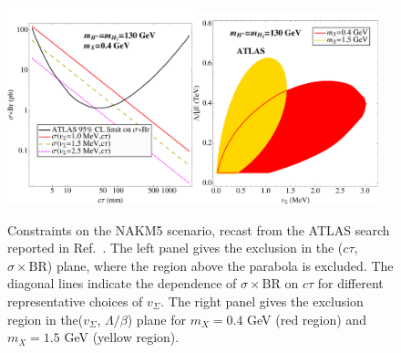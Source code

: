 \begin{figure}[!t]\centering
\includegraphics[width=0.48\textwidth,angle=0]{ch5-figures/dvlj_atlas_recast_0.pdf}\hspace*{2mm}\includegraphics[width=0.48\textwidth,angle=0]{ch5-figures/dvlj_atlas_recast.pdf}
\caption{Constraints on the NAKM5 scenario, recast from the ATLAS search reported in Ref.~\cite{Aad:2014yea}. The left panel gives the exclusion in the ($c\tau$, $\sigma\times\text{BR}$) plane, where the region above the parabola is excluded. The diagonal lines indicate the dependence of $\sigma\times\text{BR}$ on $c\tau$ for different representative choices of $v_\Sigma$. The right panel gives the exclusion region in the($v_\Sigma$, $\Lambda/\beta$) plane for $m_X=0.4$ GeV (red region) and $m_X=1.5$ GeV (yellow region).} %
\label{fig:ch5-ATLASbounds}
\end{figure}


